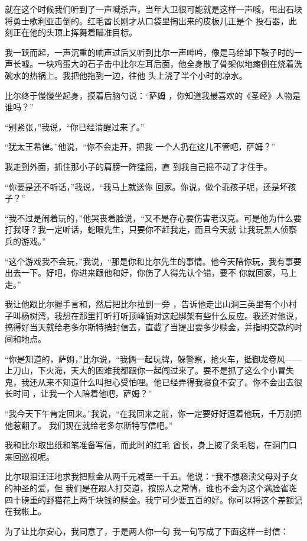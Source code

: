 \documentclass{article}
\begin{document}
就在这个时候我们听到了一声喊杀声，当年大卫很可能就是这样一声喊，甩出石块将勇士歌利亚击倒的。红毛酋长刚才从口袋里掏出来的皮板儿正是个
投石器，此刻正在他的头顶上挥舞着瞄准目标。 

我一跃而起，一声沉重的响声过后又听到比尔一声呻吟，像是马给卸下鞍子时的一声长嘘。一块鸡蛋大的石子击中比尔左耳后面，他全身散了骨架似地瘫倒在烧着洗碗水的热锅上。我把他拖到一边，往他
头上浇了半个小时的凉水。 

比尔终于慢慢坐起身，摸着后脑勺说：“萨姆
，你知道我最喜欢的《圣经》人物是谁吗？” 

“别紧张，”我说，“你已经清醒过来了。”

\newpage
 

“犹太王希律。”他说，“你不会走开，把我
一个人扔在这儿不管吧，萨姆？” 

我走到外面，抓住那小子的肩膀一阵猛摇，直
到我自己摇不动了才住手。 

“你要是还不听话，”我说，“我马上就送你
回家。你说，做个乖孩子呢，还是坏孩子？” 

“我不过是闹着玩的，”他哭丧着脸说，“又不是存心要伤害老汉克。可是他为什么要打我呀？我一定听话，蛇眼先生，只要你不赶我走，而且今天就
让我玩黑人侦察兵的游戏。” 

“这个游戏我不会玩，”我说，“那是你和比尔先生的事情。他今天陪你玩，我有事要出去一下。好吧，你进来跟他和好，你伤了人得先认个错，要不
你就回家，马上走。” 

我让他跟比尔握手言和，然后把比尔拉到一旁
\newpage
，告诉他走出山洞三英里有个小村子叫杨树湾，我想在那里打听打听顶峰镇对这起绑架有些什么反应。我还对他说，搞得好当天就给老多尔斯特捎封信去，直截了当提出要多少赎金，并指明交款的时间和地点。

“你是知道的，萨姆，”比尔说，“我俩一起玩牌，躲警察，抢火车，抵御龙卷风——上刀山，下火海，天大的困难我都跟你一起闯过来了。要不是抓了这么个小冒失鬼，我还从来不知道什么叫担心受怕哩。他已经弄得我寝食不安了。你不会出去很长时间
，让我一个人陪着他吧，萨姆？” 

“我今天下午肯定回来。”我说，“在我回来之前，你一定要好好逗着他玩，千万别把他惹翻了。
我们现在就给老多尔斯特写信吧。” 

我和比尔取出纸和笔准备写信，而此时的红毛
酋长，身上披了条毛毯，在洞门口来回巡视呢。 

比尔眼泪汪汪地求我把赎金从两千元减至一千五。他说：“我不想亵渎父母对子女的神圣的爱，但
\newpage
我们是在跟人打交道，按照人之常情，谁也不会为这个满脸雀斑四十磅重的野猫花上两千块钱的赎金。我宁可少要五百的好。你可以将这个差额记在我帐上。

为了让比尔安心，我同意了，于是两人你一句
我一句写成了下面这样一封信： 
\end{document}
